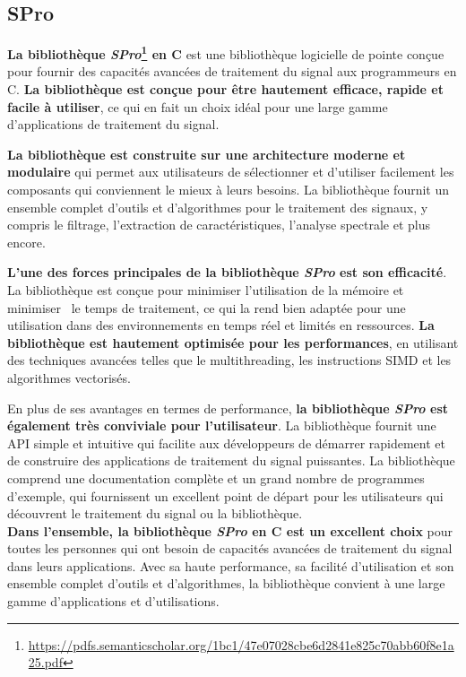 \subsection{SPro}
\label{subsec:SPro}

\textbf{La bibliothèque \textit{SPro}\footnote{\url{https://pdfs.semanticscholar.org/1bc1/47e07028cbe6d2841e825c70abb60f8e1a25.pdf}} en C} est une bibliothèque logicielle de pointe conçue pour fournir des capacités avancées de traitement du signal
aux programmeurs en C. \textbf{La bibliothèque est conçue pour être hautement efficace, rapide et facile à utiliser}, ce qui en fait un choix idéal
pour une large gamme d'applications de traitement du signal.

\textbf{La bibliothèque est construite sur une architecture moderne et modulaire} qui permet aux utilisateurs de sélectionner et d'utiliser facilement
les composants qui conviennent le mieux à leurs besoins. La bibliothèque fournit un ensemble complet d'outils et d'algorithmes pour le traitement des signaux,
y compris le filtrage, l'extraction de caractéristiques, l'analyse spectrale et plus encore.

\textbf{L'une des forces principales de la bibliothèque \textit{SPro} est son efficacité}. La bibliothèque est conçue pour minimiser l'utilisation de la mémoire et minimiser \
le temps de traitement, ce qui la rend bien adaptée pour une utilisation dans des environnements en temps réel et limités en ressources. \textbf{La bibliothèque est hautement optimisée pour
    les performances}, en utilisant des techniques avancées telles que le multithreading, les instructions SIMD et les algorithmes vectorisés.

En plus de ses avantages en termes de performance, \textbf{la bibliothèque \textit{SPro} est également très conviviale pour l'utilisateur}. La bibliothèque fournit une API simple
et intuitive qui facilite aux développeurs de démarrer rapidement et de construire des applications de traitement du signal puissantes. La bibliothèque comprend une documentation
complète et un grand nombre de programmes d'exemple, qui fournissent un excellent point de départ pour les utilisateurs qui découvrent le traitement du signal ou la bibliothèque.\\

\textbf{Dans l'ensemble, la bibliothèque \textit{SPro} en C est un excellent choix} pour toutes les personnes qui ont besoin de capacités avancées de traitement du signal dans leurs applications.
Avec sa haute performance, sa facilité d'utilisation et son ensemble complet d'outils et d'algorithmes, la bibliothèque convient à une large gamme d'applications et d'utilisations.

